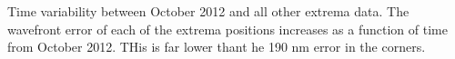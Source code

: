 Time variability between October 2012 and all other extrema data. The wavefront error of each of the extrema positions increases as a function of time from October 2012. THis is far lower thant he 190 nm error in the corners. 
\label{fig:inst_time_var}        
  